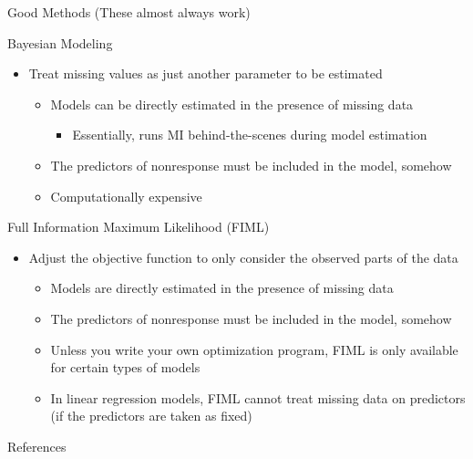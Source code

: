 \documentclass{beamer}\usepackage[]{graphicx}\usepackage[]{color}
\begin{document}
\watermarkon %

\begin{frame}[allowframebreaks]{Good Methods (These almost always work)}

  Bayesian Modeling
  \vc
  \begin{itemize}
  \item Treat missing values as just another parameter to be estimated
    \vc
    \begin{itemize}
    \item Models can be directly estimated in the presence of missing data
      \begin{itemize}
      \item Essentially, runs MI behind-the-scenes during model estimation
      \end{itemize}
      \vc
    \item The predictors of nonresponse must be included in the model, somehow
      \vc
    \item Computationally expensive
    \end{itemize}
  \end{itemize}
  
  \pagebreak
  
  Full Information Maximum Likelihood (FIML)
  \vc
  \begin{itemize} 
  \item Adjust the objective function to only consider the observed parts of the 
    data
    \vc
    \begin{itemize}
    \item Models are directly estimated in the presence of missing data
      \vc
    \item The predictors of nonresponse must be included in the model, somehow
      \vc
    \item Unless you write your own optimization program, FIML is only available 
      for certain types of models
      \vc
    \item In linear regression models, FIML cannot treat missing data on 
      predictors (if the predictors are taken as fixed)
    \end{itemize}
  \end{itemize}
  
\end{frame}


\begin{frame}[allowframebreaks]{References}

  
  

\end{frame}

\end{document}
